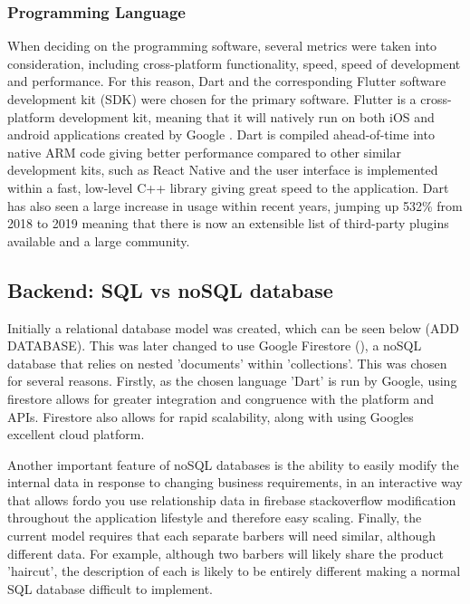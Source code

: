 \documentclass[12pt]{article}
\begin{document}
	\subsubsection{Programming Language}
	When deciding on the programming software, several metrics were taken into consideration, including cross-platform functionality, speed, speed of development and performance. For this reason, Dart and the corresponding Flutter software development kit (SDK) were chosen for the primary software. Flutter is a cross-platform development kit, meaning that it will natively run on both iOS and android applications created by Google \cite{flutter}. Dart is compiled ahead-of-time into native ARM code giving better performance compared to other similar development kits, such as React Native and the user interface  is implemented within a fast, low-level C++ library giving great speed to the application. Dart has also seen a large increase in usage within recent years, jumping up 532\% from 2018 to 2019 \cite{Github, 2018} meaning that there is now an extensible list of third-party plugins available and a large community.
	
	\subsection{Backend: SQL vs noSQL database}
	Initially a relational database model was created, which can be seen below (ADD DATABASE). This was later changed to use Google Firestore (\cite{firestore}), a noSQL database that relies on  nested 'documents' within 'collections'. This was chosen for several reasons. Firstly, as the chosen language 'Dart' is run by Google, using firestore allows for greater integration and congruence with the platform and APIs. Firestore also allows for rapid scalability, along with using Googles excellent cloud platform.
	
	Another important feature of noSQL databases is the ability to easily modify the internal data in response to changing business requirements, in an interactive way that allows fordo you use relationship data in firebase stackoverflow modification throughout the application lifestyle and therefore easy scaling.
	Finally, the current model requires that each separate barbers will need similar, although different data. For example, although two barbers will likely share the product 'haircut', the description of each is likely to be entirely different making a normal SQL database difficult to implement.
	
	
	
\end{document}
